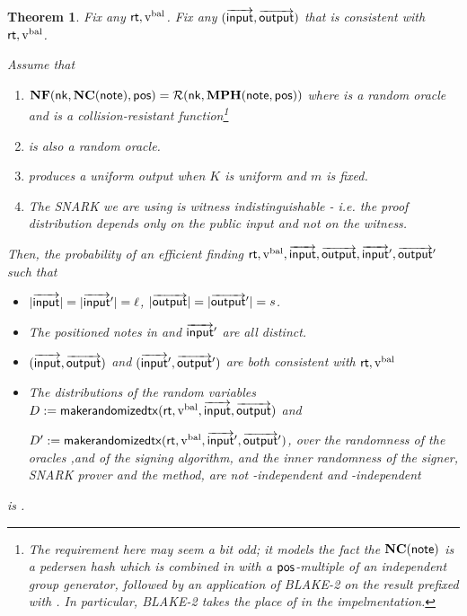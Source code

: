 \documentclass[11pt]{article}
\numberwithin{equation}{section} %
\numberwithin{figure}{section} %
\newtheorem{thm}{Theorem}[section]
\begin{document}
\begin{thm}\label{thm:indist-sapling}
Fix any $\mathsf{rt},\mathrm{v^{bal}}$.
Fix any $(\overrightarrow{\mathsf{input}},\overrightarrow{\mathsf{output}})$ that is consistent with $\mathsf{rt},\mathrm{v^{bal}}$.

Assume that 
\begin{enumerate}
 \item 
$\mathbf{NF}(\mathsf{nk},\mathbf{NC}(\mathsf{note}),\mathsf{pos})= \mathcal R(\mathsf{nk},\mathbf{MPH}(\mathsf{note},\mathsf{pos}))$ where \RO is a random oracle and \MPH is a collision-resistant function\footnote{The requirement here may seem a bit odd; it models the fact the $\mathbf{NC}(\mathsf{note})$ is a pedersen hash which is combined in \NF with a $\mathsf{pos}$-multiple of an independent group generator, followed by an application of BLAKE-2 on the result prefixed with \nk. In particular, BLAKE-2 takes the place of \RO in the impelmentation.}

\item
\KDF is also a random oracle.
\item {} produces a uniform output when $K$ is uniform and $m$ is fixed.
\item The SNARK we are using is witness indistinguishable - i.e. the proof distribution depends \emph{only} on the public input and not on the witness.
\end{enumerate}


Then, the probability of an efficient \adv finding $\mathsf{rt},\mathrm{v^{bal}},\overrightarrow{\mathsf{input}},\overrightarrow{\mathsf{output}},\overrightarrow{\mathsf{input}}',\overrightarrow{\mathsf{output}}'$
such that
\begin{itemize}
 \item 
$|\overrightarrow{\mathsf{input}}|=|\overrightarrow{\mathsf{input}}'| = \ell$, $|\overrightarrow{\mathsf{output}}|=|\overrightarrow{\mathsf{output}}'| =s $. 
\item The positioned notes in  and $\overrightarrow{\mathsf{input}}'$ are all distinct.
\item $(\overrightarrow{\mathsf{input}},\overrightarrow{\mathsf{output}})$ and $(\overrightarrow{\mathsf{input}}',\overrightarrow{\mathsf{output}}')$ are both consistent with $\mathsf{rt},\mathrm{v^{bal}}$
\item The distributions of the random variables $D:= \mathsf{makerandomizedtx}(\mathsf{rt},\mathrm{v^{bal}},\overrightarrow{\mathsf{input}},\overrightarrow{\mathsf{output}})$ and 

$D':= \mathsf{makerandomizedtx}(\mathsf{rt},\mathrm{v^{bal}},\overrightarrow{\mathsf{input}}',\overrightarrow{\mathsf{output}}')$,
over the randomness of the oracles \RO,\KDF and \ROsig of the signing algorithm, and the inner randomness of the signer, SNARK prover and the \makerandomizedtx method,
are not \negl-independent and \negl-independent
\end{itemize}
is \negl.

\end{thm}
\end{document}
